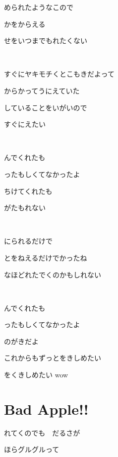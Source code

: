 \documentclass[12pt,a4paper]{article}
\begin{document}
められたようなこので

かをからえる

せをいつまでもれたくない

~

すぐにヤキモチくとこもきだよって

からかってうにえていた

していることをいがいので

すぐにえたい

~

んでくれたも

ったもしくてなかったよ

ちけてくれたも

がたもれない

~

にられるだけで

とをねえるだけでかったね

なほどれたでくのかもしれない

~

んでくれたも

ったもしくてなかったよ

のがきだよ

これからもずっとをきしめたい

をくきしめたい wow


\section{Bad Apple!!}

れてくのでも　だるさが

ほらグルグルって
\end{document}
